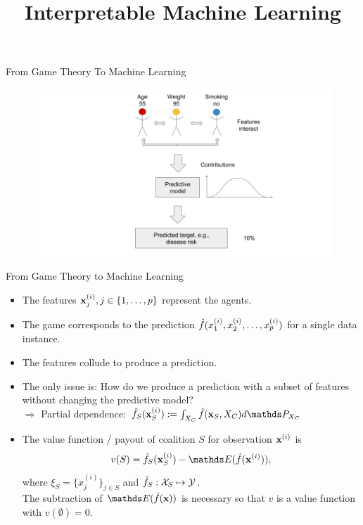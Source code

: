 \documentclass[11pt,compress,t,notes=noshow, aspectratio=169, xcolor=table]{beamer}
\title{Interpretable Machine Learning}
\date{}
\begin{document}
\newcommand{\titlefigure}{figure_man/shapley_valuefct.png}
\newcommand{\learninggoals}{
\item See model predictions as a cooperative game.
\item Transfer the Shapley value concept from game theory to machine learning.
}



\begin{vbframe}{From Game Theory To Machine Learning}

\begin{figure}
    \centering
    \includegraphics{figure/Shapley_6.png}
\end{figure}

\end{vbframe}

\begin{vbframe}{From Game Theory to Machine Learning}
\begin{itemize}
    \itemsep1em
    \item The features $\xi_j, j \in \pset$ represent the agents.
    \item The game corresponds to the prediction $\fh(x^{(i)}_1, x^{(i)}_2, \ldots, x^{(i)}_p)$ for a single data instance.
    \item The features collude to produce a prediction.
    \item The only issue is: How do we produce a prediction with a subset of features without changing the predictive model?
    \\ $\Rightarrow$ Partial dependence: $\fh_{S}(\xv_S^{(i)}) := \int_{X_C} \fh(\xv_S, X_C)d \P_{X_C}$
    \item  The value function / payout of coalition $S$ for observation $\xv^{(i)}$ is
    $$v(S) =  \fh_{S} (\xi_S) - \E (\fh(\xi)),$$ 
    where $\xi_S = \{x_j^{(i)}\}_{j \in S}$ and $\fh_S: \Xspace_S \mapsto \Yspace$. \\ The subtraction of $\E(\fh(\xv))$ is necessary so that $v$ is a value function with $v(\emptyset) = 0$.
\end{itemize}
\end{vbframe}
\end{document}
